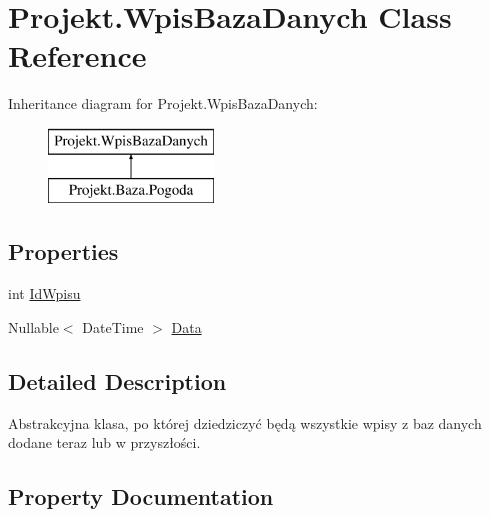 \hypertarget{class_projekt_1_1_wpis_baza_danych}{}\section{Projekt.\+Wpis\+Baza\+Danych Class Reference}
\label{class_projekt_1_1_wpis_baza_danych}


 


Inheritance diagram for Projekt.\+Wpis\+Baza\+Danych\+:\begin{figure}[H]
\begin{center}
\leavevmode
\includegraphics[height=2.000000cm]{class_projekt_1_1_wpis_baza_danych}
\end{center}
\end{figure}
\subsection*{Properties}
\begin{DoxyCompactItemize}
\item 
int \mbox{\hyperlink{class_projekt_1_1_wpis_baza_danych_a557fe384cf9d048abd0ca03a212c93f8}{Id\+Wpisu}}
\item 
Nullable$<$ Date\+Time $>$ \mbox{\hyperlink{class_projekt_1_1_wpis_baza_danych_a8ebcd21da93667deaeecbc6b607d4d5a}{Data}}
\end{DoxyCompactItemize}


\subsection{Detailed Description}


Abstrakcyjna klasa, po której dziedziczyć będą wszystkie wpisy z baz danych dodane teraz lub w przyszłości. 

\subsection{Property Documentation}
\mbox{\label{class_projekt_1_1_wpis_baza_danych_a8ebcd21da93667deaeecbc6b607d4d5a}} 
